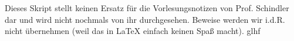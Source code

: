 \documentclass{jvfscript-de}
\begin{document}
	\frontmatter
	\maketitle
	
\tableofcontents
\newpage
\thispagestyle{plain}
Dieses Skript stellt keinen Ersatz für die Vorlesungsnotizen von Prof. Schindler dar und wird nicht nochmals von ihr durchgesehen. Beweise werden wir i.d.R. nicht übernehmen (weil das in \LaTeX{} einfach keinen Spaß macht). \hspace{\fill} glhf
\newpage
\mainmatter
{}			%
	
	
	
	
	
	
	
	
	
	
	
	

	\printindex
	\printindex[file]
\end{document}

